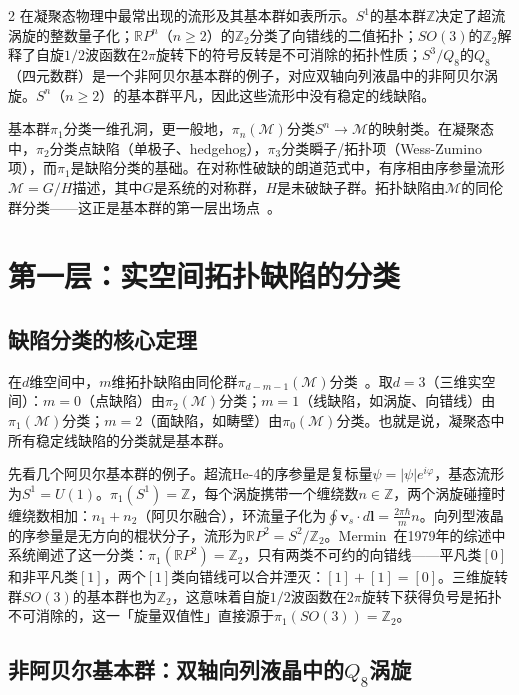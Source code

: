 \documentclass[a4paper,11pt]{ctexart}
\begin{document}
\begin{multicols}{2}
在凝聚态物理中最常出现的流形及其基本群如表所示。$S^1$的基本群$\mathbb{Z}$决定了超流涡旋的整数量子化；$\mathbb{R}P^n$（$n\ge2$）的$\mathbb{Z}_2$分类了向错线的二值拓扑；$SO(3)$的$\mathbb{Z}_2$解释了自旋$1/2$波函数在$2\pi$旋转下的符号反转是不可消除的拓扑性质；$S^3/Q_8$的$Q_8$（四元数群）是一个非阿贝尔基本群的例子，对应双轴向列液晶中的非阿贝尔涡旋。$S^n$（$n\ge2$）的基本群平凡，因此这些流形中没有稳定的线缺陷。

基本群$\pi_1$分类一维孔洞，更一般地，$\pi_n(\mathcal{M})$分类$S^n\to\mathcal{M}$的映射类。在凝聚态中，$\pi_2$分类点缺陷（单极子、hedgehog），$\pi_3$分类瞬子/拓扑项（Wess-Zumino项），而$\pi_1$是缺陷分类的基础。在对称性破缺的朗道范式中，有序相由序参量流形$\mathcal{M}=G/H$描述，其中$G$是系统的对称群，$H$是未破缺子群。拓扑缺陷由$\mathcal{M}$的同伦群分类——这正是基本群的第一层出场点~\cite{Mermin1979,Toulouse1976,Nakahara2003}。

\section{第一层：实空间拓扑缺陷的分类}

\subsection{缺陷分类的核心定理}

在$d$维空间中，$m$维拓扑缺陷由同伦群$\pi_{d-m-1}(\mathcal{M})$分类~\cite{Mermin1979,Toulouse1976}。取$d=3$（三维实空间）：$m=0$（点缺陷）由$\pi_2(\mathcal{M})$分类；$m=1$（线缺陷，如涡旋、向错线）由$\pi_1(\mathcal{M})$分类；$m=2$（面缺陷，如畴壁）由$\pi_0(\mathcal{M})$分类。也就是说，凝聚态中所有稳定线缺陷的分类就是基本群。

先看几个阿贝尔基本群的例子。超流He-4的序参量是复标量$\psi=|\psi|e^{i\varphi}$，基态流形为$S^1=U(1)$。$\pi_1(S^1)=\mathbb{Z}$，每个涡旋携带一个缠绕数$n\in\mathbb{Z}$，两个涡旋碰撞时缠绕数相加：$n_1+n_2$（阿贝尔融合），环流量子化为$\oint\mathbf{v}_s\cdot d\mathbf{l}=\frac{2\pi\hbar}{m}n$。向列型液晶的序参量是无方向的棍状分子，流形为$\mathbb{R}P^2=S^2/\mathbb{Z}_2$。Mermin~\cite{Mermin1979}在1979年的综述中系统阐述了这一分类：$\pi_1(\mathbb{R}P^2)=\mathbb{Z}_2$，只有两类不可约的向错线——平凡类$[0]$和非平凡类$[1]$，两个$[1]$类向错线可以合并湮灭：$[1]+[1]=[0]$。三维旋转群$SO(3)$的基本群也为$\mathbb{Z}_2$，这意味着自旋$1/2$波函数在$2\pi$旋转下获得负号是拓扑不可消除的，这一「旋量双值性」直接源于$\pi_1(SO(3))=\mathbb{Z}_2$。

\subsection{非阿贝尔基本群：双轴向列液晶中的$Q_8$涡旋}


\end{multicols}
\end{document}
